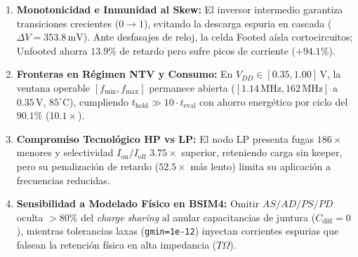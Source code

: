 \begin{enumerate}[leftmargin=1.5em,itemsep=0.03em,parsep=0pt,topsep=0.05em]
  \item \textbf{Monotonicidad e Inmunidad al Skew:} El inversor intermedio garantiza transiciones crecientes ($0 \to 1$), evitando la descarga espuria en cascada ($\Delta V = 353.8\,\text{mV}$). Ante desfasajes de reloj, la celda Footed aísla cortocircuitos; Unfooted ahorra $13.9\%$ de retardo pero sufre picos de corriente ($+94.1\%$).
  \item \textbf{Fronteras en Régimen NTV y Consumo:} En $V_{DD} \in [0.35, 1.00]\,\text{V}$, la ventana operable $[f_{\min}, f_{\max}]$ permanece abierta ($[1.14\,\text{MHz}, 162\,\text{MHz}]$ a $0.35\,\text{V}$, $85^\circ\text{C}$), cumpliendo $t_{\text{hold}} \gg 10 \cdot t_{\text{eval}}$ con ahorro energético por ciclo del $90.1\%$ ($10.1\times$).
  \item \textbf{Compromiso Tecnológico HP vs LP:} El nodo LP presenta fugas $186\times$ menores y selectividad $I_{\text{on}}/I_{\text{off}}$ $3.75\times$ superior, reteniendo carga sin keeper, pero su penalización de retardo ($52.5\times$ más lento) limita su aplicación a frecuencias reducidas.
  \item \textbf{Sensibilidad a Modelado Físico en BSIM4:} Omitir $AS/AD/PS/PD$ oculta $>80\%$ del \textit{charge sharing} al anular capacitancias de juntura ($C_{\text{diff}}=0$), mientras tolerancias laxas (\texttt{gmin=1e-12}) inyectan corrientes espurias que falsean la retención física en alta impedancia ($T\Omega$).
\end{enumerate}
